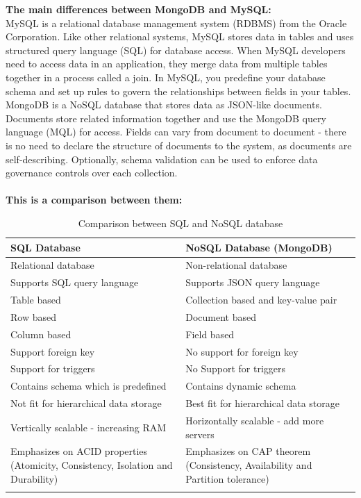 \textbf{The main differences between MongoDB and MySQL:}\\
MySQL is a relational database management system (RDBMS) from the Oracle Corporation. Like other relational systems, MySQL stores data in tables and uses structured query language (SQL) for database access. When MySQL developers need to access data in an application, they merge data from multiple tables together in a process called a join. In MySQL, you predefine your database schema and set up rules to govern the relationships between fields in your tables.\\

MongoDB is a NoSQL database that stores data as JSON-like documents. Documents store related information together and use the MongoDB query language (MQL) for access. Fields can vary from document to document - there is no need to declare the structure of documents to the system, as documents are self-describing. Optionally, schema validation can be used to enforce data governance controls over each collection.\\
\\
 \textbf{This is a comparison between them:} \cite{AF2}\\

 \begin{longtable}{||p{8cm}||p{8cm}||}
 \hline
 \textbf{SQL Database} & \textbf{NoSQL Database (MongoDB)} \\  
 \hline\hline
 Relational database & Non-relational database  \\ 
 \hline
 Supports SQL query language & Supports JSON query language \\
 \hline
 Table based & Collection based and key-value pair \\
 \hline
 Row based & Document based  \\
 \hline
 Column based & Field based \\ 
 \hline
 Support foreign key & No support for foreign key\\ 
 \hline 
 Support for triggers & No Support for triggers\\
 \hline
 Contains schema which is predefined & Contains dynamic schema\\
 \hline
 Not fit for hierarchical data storage & Best fit for hierarchical data storage\\
 \hline
 Vertically scalable - increasing RAM & Horizontally scalable - add more servers\\
 \hline
 Emphasizes on ACID properties (Atomicity, Consistency, Isolation and Durability) & Emphasizes on CAP theorem (Consistency, Availability and Partition tolerance)\\
 \hline
 \caption{Comparison between SQL and NoSQL database}
\end{longtable}\\

